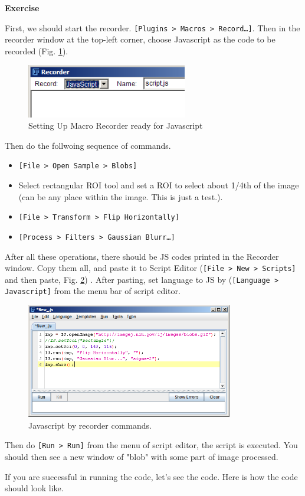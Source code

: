 \documentclass[11pt,a4paper,oneside]{report}
\newenvironment{indentexercise}[1]%
{{\setlength{\leftmargin}{2em}}%
\textbf{Exercise \thesubsection-#1}%
\begin{list}{}%
	\item%
}
{\end{list}}
\newcommand{\ijmenu}[1]{\texttt{\small#1}}
\newcommand{\ilcom}[1]{\texttt{\small#1}}
\begin{document}
\begin{indentexercise}{1}
First, we should start the recorder. 
\ijmenu{[Plugins > Macros > Record\dots]}. 
Then in the recorder window at the top-left corner, 
choose Javascript as the code to be recorded (Fig. \ref{fig:MacroRecorderJS}). 

\begin{figure}[htbp]
\begin{center}
\includegraphics[width=70mm]{fig2/RecorderJS.png}
\caption{Setting Up Macro Recorder ready for Javascript}
\label{fig:MacroRecorderJS}
\end{center}
\end{figure}

Then do the follwoing sequence of commands.
\begin{itemize}
\item \ijmenu{[File > Open Sample > Blobs]}
\item Select rectangular ROI tool and set a ROI to select 
about 1/4th of the image (can be any place within the image. This is just a test.). 
\item \ijmenu{[File > Transform > Flip Horizontally]}
\item \ijmenu{[Process > Filters > Gaussian Blurr\dots]}
\end{itemize}
After all these operations, there should be JS codes printed in the Recorder window. 
Copy them all, and paste it to Script Editor (\ilcom{[File > New > Scripts]} and then paste, 
Fig. \ref{fig:ScriptEditorRecorded}) . 
After pasting, set language to JS by (\ilcom{[Language > Javascript]} from the menu bar of script editor.  

\begin{figure}[htbp]
\begin{center}
\includegraphics[height=50mm]{fig2/JSrecordedInScriptEditor.png}
\caption{Javascript by recorder commands.}
\label{fig:ScriptEditorRecorded}
\end{center}
\end{figure}

Then do \ilcom{[Run > Run]} from the menu of script editor, the script is executed. 
You should then see a new window of "blob" with some part of image processed. 
\end{indentexercise}
If you are successful in running the code, let's see the code. Here is how the code should look like. 
\end{document}
